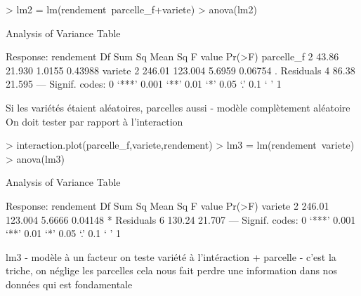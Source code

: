 \documentclass{article}
\begin{document}
\begin{Schunk}
\begin{Sinput}
> lm2 = lm(rendement~parcelle_f+variete)
> anova(lm2)
\end{Sinput}
\begin{Soutput}
Analysis of Variance Table

Response: rendement
           Df Sum Sq Mean Sq F value  Pr(>F)  
parcelle_f  2  43.86  21.930  1.0155 0.43988  
variete     2 246.01 123.004  5.6959 0.06754 .
Residuals   4  86.38  21.595                  
---
Signif. codes:  0 ‘***’ 0.001 ‘**’ 0.01 ‘*’ 0.05 ‘.’ 0.1 ‘ ’ 1
\end{Soutput}
\end{Schunk}
Si les variétés étaient aléatoires, parcelles aussi - modèle complètement aléatoire
On doit tester par rapport à l'interaction
\begin{Schunk}
\begin{Sinput}
> interaction.plot(parcelle_f,variete,rendement)
> lm3 = lm(rendement~variete)
> anova(lm3)
\end{Sinput}
\begin{Soutput}
Analysis of Variance Table

Response: rendement
          Df Sum Sq Mean Sq F value  Pr(>F)  
variete    2 246.01 123.004  5.6666 0.04148 *
Residuals  6 130.24  21.707                  
---
Signif. codes:  0 ‘***’ 0.001 ‘**’ 0.01 ‘*’ 0.05 ‘.’ 0.1 ‘ ’ 1
\end{Soutput}
\end{Schunk}

lm3 - modèle à un facteur
on teste variété à l'intéraction + parcelle - c'est la triche, on néglige les parcelles
cela nous fait perdre une information dans nos données qui est fondamentale
\end{document}
